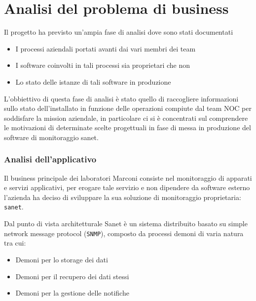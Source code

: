 \chapter{Analisi del problema di business}

Il progetto ha previsto un'ampia fase di analisi dove sono stati documentati

\begin{itemize}
  \item{I processi aziendali portati avanti dai vari membri dei team}
  \item{I software coinvolti in tali processi sia proprietari che non}
  \item{Lo stato delle istanze di tali software in produzione}
\end{itemize}

L'obbiettivo di questa fase di analisi è stato quello di raccogliere informazioni sullo stato dell'installato in funzione delle operazioni compiute dal team NOC per soddisfare la mission aziendale, in particolare ci si è concentrati sul comprendere le motivazioni di determinate scelte progettuali in fase di messa in produzione del software di monitoraggio sanet.

\newpage
\subsection{Analisi dell'applicativo}
Il business principale dei laboratori Marconi consiste nel monitoraggio di apparati e servizi applicativi, per erogare tale servizio e non dipendere da software esterno l'azienda ha deciso di sviluppare la sua soluzione di monitoraggio proprietaria: \verb|sanet|.

Dal punto di vista architetturale Sanet è un sistema distribuito basato su simple network message protocol (\verb|SNMP|), composto da processi demoni di varia natura tra cui:

\begin{itemize}
  \item{Demoni per lo storage dei dati}
  \item{Demoni per il recupero dei dati stessi}
  \item{Demoni per la gestione delle notifiche}
\end{itemize}

